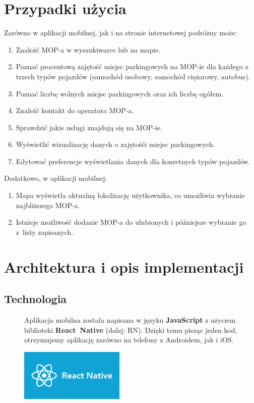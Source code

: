 \section{Przypadki użycia}
Zarówno w aplikacji mobilnej, jak i na stronie internetowej podróżny może:
\begin{enumerate}
\item Znaleźć MOP-a w wyszukiwarce lub na mapie.
\item Poznać procentową zajętość miejsc parkingowych na MOP-ie dla każdego z trzech typów pojazdów (samochód osobowy, samochód ciężarowy, autobus).
\item Poznać liczbę wolnych miejsc parkingowych oraz ich liczbę ogółem.
\item Znaleźć kontakt do operatora MOP-a.
\item Sprawdzić jakie usługi znajdują się na MOP-ie.
\item Wyświetlić wizualizację danych o zajętośći miejsc parkingowych.
\item Edytować preferencje wyświetlania danych dla konretnych typów pojazdów.
\end{enumerate}
Dodatkowo, w aplikacji mobilnej:
\begin{enumerate}
\item Mapa wyświetla aktualną lokalizację użytkownika, co umożliwia wybranie najbliższego MOP-a. 
\item Istnieje możliwość dodanie MOP-a do ulubionych i późniejsze wybranie go z~listy zapisanych.
\end{enumerate}


\section{Architektura i opis implementacji}

\subsection{Technologia}
\begin{figure}[!htb]
    \centering
    \begin{minipage}{.6\textwidth}
Aplikacja mobilna została napisana w języku \textbf{JavaScript} z użyciem biblioteki \textbf{React~Native} (dalej: RN). Dzięki temu pisząc jeden kod, otrzymujemy aplikację zarówno na telefony z Androidem, jak i iOS.
    \end{minipage}%
    \begin{minipage}{.4\textwidth}
        \centering
        \includegraphics[width=5cm]{images/ReactNative.png}\label{RN_logo}
    \end{minipage}
\end{figure}

